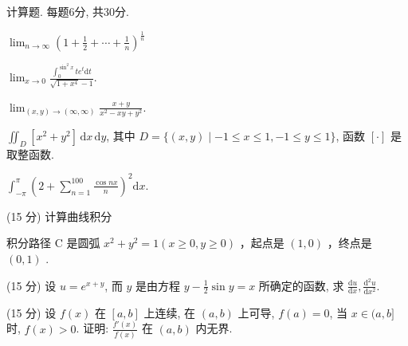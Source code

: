 \par{}
计算题. 每题6分, 共30分.\par
$\lim_{n\to\infty}\left(1+\frac{1}{2}+\cdots+\frac{1}{n}\right)^{\frac{1}{n}}$\par
$\lim_{x\to 0}\frac{\int_0^{\sin^2x}te^t\mathrm{d}t}{\sqrt{1 + x^4} - 1}.$\par
$\lim_{(x,y)\to (\infty ,\infty)}\frac{x + y}{x^2 - xy + y^2}.$\par
$\iint_{D} [x^{2} + y^{2}] \, \mathrm{d}x \, \mathrm{d}y$, 其中 $D = \{(x, y) \mid -1 \leq x \leq 1, -1 \leq y \leq 1\}$, 函数 $[\cdot]$ 是取整函数.\par
$\int_{-\pi}^{\pi}\left(2 + \sum_{n = 1}^{100}\frac{\cos nx}{n}\right)^{2}\mathrm{d}x.$\par
\par{}
\par{}
(15 分) 计算曲线积分\par
\nopagebreak[4]
积分路径 C 是圆弧  $x^{2} + y^{2} = 1 (x \geq 0, y \geq 0)$ ，起点是  $(1, 0)$ ，终点是  $(0, 1)$ .\par
\par{}
(15 分) 设 $u = e^{x + y}$, 而 $y$ 是由方程 $y - \frac{1}{2} \sin y = x$ 所确定的函数, 求 $\frac{\mathrm{d} u}{\mathrm{d} x}, \frac{\mathrm{d}^2 u}{\mathrm{d} x^2}$.\par
\par{}
(15 分) 设 $f(x)$ 在 $[a, b]$ 上连续, 在 $(a, b)$ 上可导, $f(a) = 0$, 当 $x \in (a, b]$ 时, $f(x) > 0$. 证明: $\frac{f'(x)}{f(x)}$ 在 $(a, b)$ 内无界.\par
